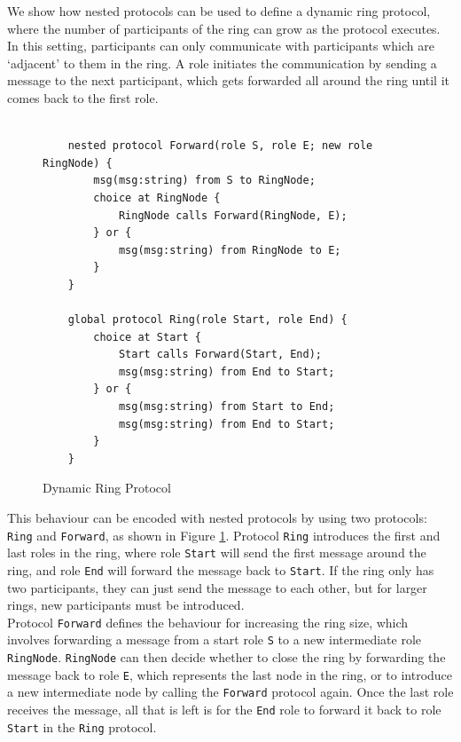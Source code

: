 \documentclass[12pt,twoside]{report}
\begin{document}
We show how nested protocols can be used to define a dynamic ring protocol, where the number of participants of the ring can grow as the protocol executes. In this setting, participants can only communicate with participants which are `adjacent' to them in the ring. A role initiates the communication by sending a message to the next participant, which gets forwarded all around the ring until it comes back to the first role.

\begin{figure}[htb!]
    \centering
    \lstset{language=Scribble}
    \begin{lstlisting}
    
    nested protocol Forward(role S, role E; new role RingNode) {
        msg(msg:string) from S to RingNode;
        choice at RingNode {
            RingNode calls Forward(RingNode, E);
        } or {
            msg(msg:string) from RingNode to E;
        }
    }
        
    global protocol Ring(role Start, role End) {
        choice at Start {
            Start calls Forward(Start, End);
            msg(msg:string) from End to Start;
        } or {
            msg(msg:string) from Start to End;
            msg(msg:string) from End to Start;
        }
    }
    \end{lstlisting}
    \caption{Dynamic Ring Protocol}
    \label{ring-protocol}
\end{figure}{}

This behaviour can be encoded with nested protocols by using two protocols: \texttt{Ring} and \texttt{Forward}, as shown in Figure \ref{ring-protocol}. Protocol \texttt{Ring} introduces the first and last roles in the ring, where role \texttt{Start} will send the first message around the ring, and role \texttt{End} will forward the message back to \texttt{Start}. If the ring only has two participants, they can just send the message to each other, but for larger rings, new participants must be introduced.\\

Protocol \texttt{Forward} defines the behaviour for increasing the ring size, which involves forwarding a message from a start role \texttt{S} to a new intermediate role \texttt{RingNode}. \texttt{RingNode} can then decide whether to close the ring by forwarding the message back to role \texttt{E}, which represents the last node in the ring, or to introduce a new intermediate node by calling the \texttt{Forward} protocol again. Once the last role receives the message, all that is left is for the \texttt{End} role to forward it back to role \texttt{Start} in the \texttt{Ring} protocol. 
\end{document}
